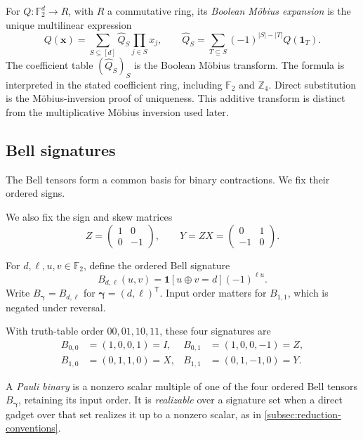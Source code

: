 \documentclass[11pt,letterpaper,onecolumn]{article}
\theoremstyle{plain}
\theoremstyle{definition}
\theoremstyle{remark}
\newcommand{\Ftwo}{\mathbb F_2}
\newcommand{\one}{\mathbf 1}
\begin{document}
For \(Q:\Ftwo^d\to R\), with \(R\) a commutative ring, its
\emph{Boolean Möbius expansion} is the unique multilinear expression
\[
 Q({\mathbf{x}})=\sum_{S\subseteq[d]}\widehat Q_S\prod_{j\in S}x_j,
 \qquad
 \widehat Q_S
 =\sum_{T\subseteq S}(-1)^{|S|-|T|}Q(\one_T).
\]
The coefficient table \((\widehat Q_S)_S\) is the Boolean Möbius transform.
The formula is interpreted in the stated coefficient ring, including
\(\Ftwo\) and \(\mathbb Z_4\).  Direct substitution is the Möbius-inversion
proof of uniqueness.  This additive transform is distinct from the
multiplicative Möbius inversion used later.

\subsection{Bell signatures}
\label{subsec:pauli-notation}

The Bell tensors form a common basis for binary contractions.
We fix their ordered signs.

We also fix the sign and skew matrices
\[
  Z=\begin{pmatrix}1&0\\0&-1\end{pmatrix},
  \qquad
  Y=ZX=\begin{pmatrix}0&1\\-1&0\end{pmatrix}.
\]

For \(d,\ell,u,v\in\Ftwo\), define the ordered Bell signature
\begin{equation*}
  B_{d,\ell}(u,v)
  =
  \one[u\oplus v=d](-1)^{\ell u}.
\end{equation*}
Write \(B_{\boldsymbol{\gamma}}=B_{d,\ell}\) for \({\boldsymbol{\gamma}}=(d,\ell)^{\mathsf T}\).  Input order matters
for \(B_{1,1}\), which is negated under reversal.

With truth-table order \(00,01,10,11\), these four signatures are
\begin{equation}
 \begin{aligned}
  B_{0,0}&=(1,0,0,1)=I,&
  B_{0,1}&=(1,0,0,-1)=Z,\\
  B_{1,0}&=(0,1,1,0)=X,&
  B_{1,1}&=(0,1,-1,0)=Y.
 \end{aligned}
 \label{eq:bell-matrix-dictionary}
\end{equation}

A \emph{Pauli binary} is a nonzero scalar multiple of one of the four
ordered Bell tensors \(B_{\boldsymbol{\gamma}}\), retaining its input order.
It is \emph{realizable} over a signature set when a direct gadget over that
set realizes it up to a nonzero scalar, as in
\cref{subsec:reduction-conventions}.
\end{document}
